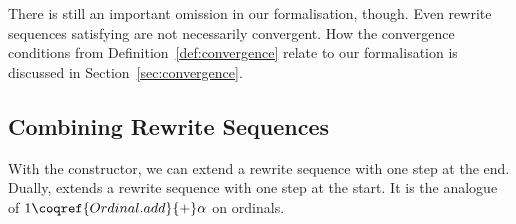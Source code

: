 There is still an important omission in our formalisation,
though. Even rewrite sequences satisfying
 are not necessarily
convergent. How the convergence conditions from
Definition~\ref{def:convergence} relate to our formalisation is
discussed in Section~\ref{sec:convergence}.


\subsection{Combining Rewrite Sequences}\label{sub:combining}

With the 
constructor, we can extend a rewrite sequence with one step at the
end. Dually,  extends
a rewrite sequence with one step at the start. It is the analogue of
$1 \coqref{Ordinal.add}{+} \alpha$ on ordinals.

